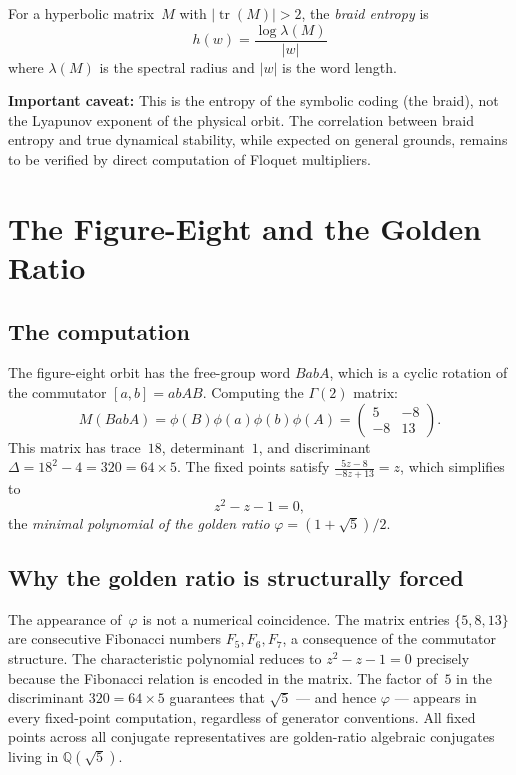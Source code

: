 \documentclass[11pt]{article}
\theoremstyle{definition}
\newcommand{\Q}{\mathbb{Q}}
\DeclareMathOperator{\tr}{tr}
\begin{document}
For a hyperbolic matrix~$M$ with $|\tr(M)| > 2$, the \emph{braid
entropy} is
\begin{equation}\label{eq:entropy}
h(w) = \frac{\log \lambda(M)}{|w|}
\end{equation}
where $\lambda(M)$ is the spectral radius and $|w|$ is the word
length.

\textbf{Important caveat:} This is the entropy of the symbolic
coding (the braid), not the Lyapunov exponent of the physical
orbit. The correlation between braid entropy and true dynamical
stability, while expected on general grounds, remains to be verified
by direct computation of Floquet multipliers.


\section{The Figure-Eight and the Golden Ratio}\label{sec:figure-eight}

\subsection{The computation}

The figure-eight orbit has the free-group word $BabA$, which is a
cyclic rotation of the commutator $[a,b] = abAB$. Computing the
$\Gamma(2)$ matrix:
\begin{equation}\label{eq:fig-eight-matrix}
M(BabA) = \phi(B)\phi(a)\phi(b)\phi(A) =
\begin{pmatrix} 5 & -8 \\ -8 & 13 \end{pmatrix}.
\end{equation}
This matrix has trace~$18$, determinant~$1$, and discriminant
$\Delta = 18^2 - 4 = 320 = 64 \times 5$. The fixed points satisfy
$\frac{5z - 8}{-8z + 13} = z$, which simplifies to
\begin{equation}\label{eq:golden-poly}
z^2 - z - 1 = 0,
\end{equation}
the \emph{minimal polynomial of the golden ratio}
$\varphi = (1+\sqrt{5})/2$.

\subsection{Why the golden ratio is structurally forced}

The appearance of~$\varphi$ is not a numerical coincidence. The
matrix entries $\{5, 8, 13\}$ are consecutive Fibonacci numbers
$F_5, F_6, F_7$, a consequence of the commutator structure. The
characteristic polynomial reduces to $z^2 - z - 1 = 0$ precisely
because the Fibonacci relation is encoded in the matrix. The
factor of~$5$ in the discriminant $320 = 64 \times 5$ guarantees
that $\sqrt{5}$ --- and hence $\varphi$ --- appears in every
fixed-point computation, regardless of generator conventions. All
fixed points across all conjugate representatives are golden-ratio
algebraic conjugates living in $\Q(\sqrt{5})$.
\end{document}
